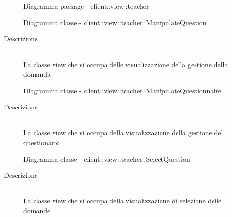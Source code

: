 \begin{center}
\begin{figure}[H]
		\caption{Diagramma package - client::view::teacher}
	\end{figure}
\end{center}\hypertarget{client::view::teacher::ManipulateQuestion}{}
\begin{figure}[H]
	\centering
	\caption{Diagramma classe - client::view::teacher::ManipulateQuestion}
\end{figure}\begin{description}
\item[Descrizione] \hfill \\
La classe view che si occupa delle visualizzazione della gestione della domanda
\end{description}

\vspace{0.5cm}
\hypertarget{client::view::teacher::ManipulateQuestionnaire}{}
\begin{figure}[H]
	\centering
	\caption{Diagramma classe - client::view::teacher::ManipulateQuestionnaire}
\end{figure}\begin{description}
\item[Descrizione] \hfill \\
La classe view che si occupa della visualizzazione della gestione del questionario 
\end{description}

\vspace{0.5cm}
\hypertarget{client::view::teacher::SelectQuestion}{}
\begin{figure}[H]
	\centering
	\caption{Diagramma classe - client::view::teacher::SelectQuestion}
\end{figure}\begin{description}
\item[Descrizione] \hfill \\
La classe view che si occupa della visualizzazione di selezione delle domande
\end{description}

